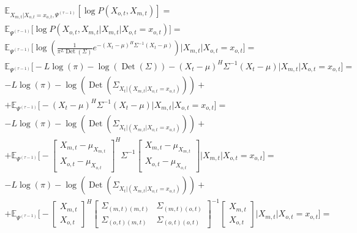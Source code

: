 \documentclass[11pt]{article}
\newcommand{\Expect}{\mathbb{E}}
\DeclareMathOperator{\Det}{Det}
\begin{document}
\begin{equation*}
\begin{gathered}
\Expect_{X_{m,t}|X_{o,t}=x_{o,t}, \Psi^{(\tau-1)}}[\log P(X_{o,t}, X_{m,t})]=\\
\Expect_{\Psi^{(\tau-1)}}\Big[\log P(X_{o,t}, X_{m,t}\Big|X_{m,t}|X_{o,t}=x_{o,t})\Big]=\\
\Expect_{\Psi^{(\tau-1)}}\bigg[\log \left(\frac{1}{\pi^{L}\Det(\Sigma)}e^{-(X_t-\mu)^H\Sigma^{-1}(X_t-\mu)}\right)\Big|X_{m,t}|X_{o,t}=x_{o,t}\bigg]=\\
\Expect_{\Psi^{(\tau-1)}}\bigg[-L \log(\pi) - \log (\Det(\Sigma)) - (X_t - \mu)^H\Sigma^{-1}(X_t - \mu)\Big|X_{m,t}|X_{o,t}=x_{o,t}\bigg]=\\
-L \log(\pi) - \log (\Det(\Sigma_{X_t|(X_{m,t}|X_{o,t}=x_{o,t})})) + \\ + \Expect_{\Psi^{(\tau-1)}}\bigg[- (X_t - \mu)^H\Sigma^{-1}(X_t - \mu)\Big|X_{m,t}|X_{o,t}=x_{o,t}\bigg]=\\
-L \log(\pi) - \log (\Det(\Sigma_{X_t|(X_{m,t}|X_{o,t}=x_{o,t})}))  + \\ + \Expect_{\Psi^{(\tau-1)}}\bigg[- 
\begin{bmatrix} X_{m,t} - \mu_{X_{m,t}} \\  X_{o,t} - \mu_{X_{o,t}} \end{bmatrix}^H \Sigma^{-1}
\begin{bmatrix} X_{m,t} - \mu_{X_{m,t}} \\  X_{o,t} - \mu_{X_{o,t}} \end{bmatrix}\Big|X_{m,t}|X_{o,t}=x_{o,t}\bigg] = \\
-L \log(\pi) - \log (\Det(\Sigma_{X_t|(X_{m,t}|X_{o,t}=x_{o,t})}))  + \\ + \Expect_{\Psi^{(\tau-1)}}\bigg[- 
\begin{bmatrix} X_{m,t} \\  X_{o,t} \end{bmatrix}^H
\begin{bmatrix} \Sigma_{(m,t)(m,t)} & \Sigma_{(m,t)(o,t)} \\  \Sigma_{(o,t)(m,t)} & \Sigma_{(o,t)(o,t)} \end{bmatrix}^{-1}
\begin{bmatrix} X_{m,t} \\  X_{o,t} \end{bmatrix}\Big|X_{m,t}|X_{o,t}=x_{o,t}\bigg] = \\
\end{gathered}
\end{equation*}
\end{document}

